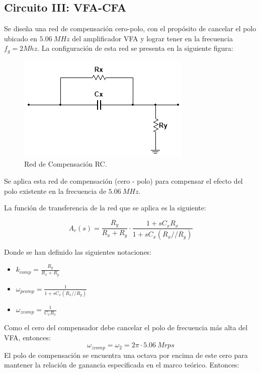 \subsection{Circuito III: VFA-CFA}

\hspace{1mm} Se diseña una red de compensación cero-polo, con el propósito de cancelar el polo ubicado en \(5.06~MHz\) del amplificador VFA y lograr tener en la frecuencia \(f_g= 2Mhz\). La configuración de esta red se presenta en la siguiente figura:

\begin{figure}[!h]
    \centering
    \includegraphics[width=0.5\linewidth]{Imagenes/Red de compensacion RC.png}
    \caption{Red de Compensación RC.}
\end{figure}

\hspace{1mm} Se aplica esta red de compensación (cero - polo) para compensar el efecto del polo existente en la frecuencia de \(5.06~MHz\).

\bigskip
\hspace{1mm} La función de transferencia de la red que se aplica es la siguiente:

\begin{equation}
    A_c(s) = \frac{R_y}{R_x + R_y} \cdot \frac{1 + sC_x R_x}{1 + sC_x (R_x // R_y)}
\end{equation}

\hspace{1mm} Donde se han definido las siguientes notaciones:

\begin{itemize}[itemsep=1pt]
    \item \(k_{comp}=\frac{R_y}{R_x + R_y}\)
    \item \( \omega_{pcomp} =  \frac{1 }{1 + sC_x (R_x // R_y)}\)
    \item \(\omega_{zcomp} = \frac{1 }{ C_xR_x}\)
\end{itemize}

\hspace{1mm} Como el cero del compensador debe cancelar el polo de frecuencia más alta del VFA, entonces:
\begin{equation}
    \omega_{zcomp} = \omega_2 = 2\pi \cdot 5.06~Mrps
\end{equation}
\hspace{1mm} El polo de compensación se encuentra una octava por encima de este cero para mantener la relación de ganancia especificada en el marco teórico. Entonces:

